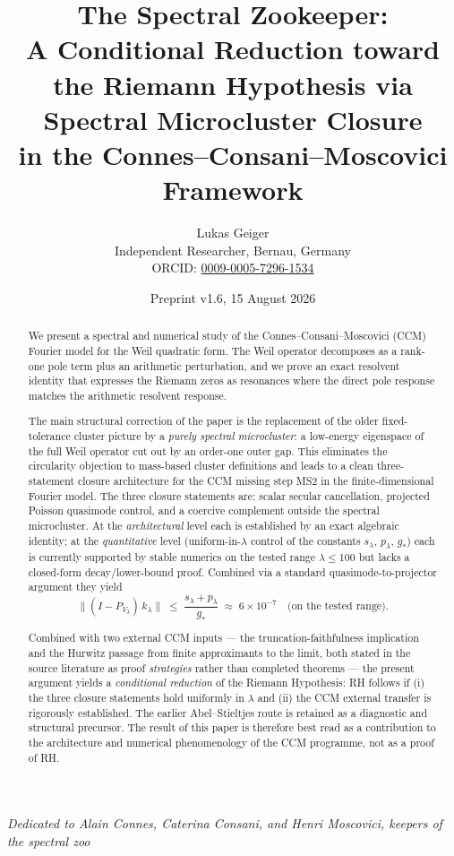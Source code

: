 \documentclass[12pt,a4paper]{article}
\title{The Spectral Zookeeper:\\[4pt]
{\large A Conditional Reduction toward the Riemann Hypothesis via Spectral Microcluster Closure}\\[2pt]
{\large in the Connes--Consani--Moscovici Framework}}
\author{Lukas Geiger\\
\small Independent Researcher, Bernau, Germany\\
\small ORCID: \href{https://orcid.org/0009-0005-7296-1534}{0009-0005-7296-1534}}
\date{Preprint v1.6, 15 August 2026}
\theoremstyle{definition}
\theoremstyle{remark}
\begin{document}
\overfullrule=0pt
\maketitle

\begin{center}
\textit{Dedicated to Alain Connes, Caterina Consani, and Henri Moscovici, keepers of the spectral zoo}
\end{center}

\begin{abstract}
We present a spectral and numerical study of the
Connes--Consani--Moscovici (CCM) Fourier model for the Weil quadratic
form.  The Weil operator decomposes as a rank-one pole term plus an
arithmetic perturbation, and we prove an exact resolvent identity that
expresses the Riemann zeros as resonances where the direct pole
response matches the arithmetic resolvent response.

The main structural correction of the paper is the replacement of the
older fixed-tolerance cluster picture by a \emph{purely spectral
microcluster}: a low-energy eigenspace of the full Weil operator cut
out by an order-one outer gap.  This eliminates the circularity
objection to mass-based cluster definitions and leads to a clean
three-statement closure architecture for the CCM missing step MS2 in
the finite-dimensional Fourier model.  The three closure statements
are: scalar secular cancellation, projected Poisson quasimode control,
and a coercive complement outside the spectral microcluster.  At the
\emph{architectural} level each is established by an exact algebraic
identity; at the \emph{quantitative} level (uniform-in-$\lambda$
control of the constants $s_\lambda$, $p_\lambda$, $g_*$) each is
currently supported by stable numerics on the tested range
$\lambda \le 100$ but lacks a closed-form decay/lower-bound proof.
Combined via a standard quasimode-to-projector argument they yield
\[
  \|(I - P_{V_\lambda})\, k_\lambda\|
  \;\leq\; \frac{s_\lambda + p_\lambda}{g_*}
  \;\approx\; 6 \times 10^{-7}
  \quad\text{(on the tested range)}.
\]

Combined with two external CCM inputs --- the truncation-faithfulness
implication and the Hurwitz passage from finite approximants to the
limit, both stated in the source literature as proof
\emph{strategies} rather than completed theorems --- the present
argument yields a \emph{conditional reduction} of the Riemann
Hypothesis: RH follows if (i) the three closure statements hold
uniformly in $\lambda$ and (ii) the CCM external transfer is
rigorously established.  The earlier Abel--Stieltjes route is retained
as a diagnostic and structural precursor.  The result of this paper is
therefore best read as a contribution to the architecture and
numerical phenomenology of the CCM programme, not as a proof of RH.
\end{abstract}
\end{document}
